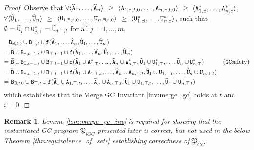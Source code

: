 \documentclass{article}
\numberwithin{equation}{section}
\newtheorem{rmk}{Remark}[section]
\renewcommand{\tt}[1]{\ifmmode\text{\texttt{#1}}\else\texttt{#1}\fi}
\begin{document}
\begin{proof}
Observe that $\forall \langle \widehat{\tt{A}}_1, \dots, \widehat{\tt{A}}_n \rangle$ $\geq$ $\langle \tt{A}_{1,\exists,t,0}, \dots, \tt{A}_{n,\exists,t,0} \rangle$ $\geq$ $\langle \tt{A}_{1,\exists}^*, \dots, \tt{A}_{n,\exists}^* \rangle$,
$\forall \langle \widehat{\tt{U}}_1, \dots, \widehat{\tt{U}}_n \rangle$ $\geq$ $\langle \tt{U}_{1,\exists,t,0}, \dots, \tt{U}_{n,\exists,t,0} \rangle$ $\geq$ $\langle \tt{U}_{1,\exists}^*, \dots, \tt{U}_{n,\exists}^* \rangle$,
such that $\emptyset = \widetilde{\tt{U}}_j \cap \tt{U}_{j,\top}^* = \widetilde{\tt{U}}_{j,\top,t}$ for all $j = 1,\dots,m$,
\begin{align*}
&
\tt{B}_{\exists,t,0} \cup \tt{B}_{\top,t}
\cup \tt{f}(\widehat{\tt{A}}_1, \dots, \widehat{\tt{A}}_n, \widehat{\tt{U}}_1, \dots, \widehat{\tt{U}}_m)
\\
=&~
\widetilde{\tt{B}} \cup \tt{B}_{\exists,t-1,\iota} \cup \tt{B}_{\top,t-1}
\cup \tt{f}(\widehat{\tt{A}}_1, \dots, \widehat{\tt{A}}_n, \widehat{\tt{U}}_1, \dots, \widehat{\tt{U}}_m)
\\
=&~
\widetilde{\tt{B}} \cup \tt{B}_{\exists,t-1,\iota} \cup \tt{B}_{\top,t-1}
\cup \tt{f}(
\widehat{\tt{A}}_1 \cup \tt{A}_{1,\top}^*, \dots, \widehat{\tt{A}}_n \cup \tt{A}_{n,\top}^*,
\widehat{\tt{U}}_1 \cup \tt{U}_{1,\top}^*, \dots, \widehat{\tt{U}}_n \cup \tt{U}_{n,\top}^*)
&\text{(\tt{GC} safety)}
\\
=&~
\widetilde{\tt{B}} \cup \tt{B}_{\exists,t-1,\iota} \cup \tt{B}_{\top,t-1}
\cup \tt{f}(
\widehat{\tt{A}}_1 \cup \tt{A}_{1,\top,t}, \dots, \widehat{\tt{A}}_n \cup \tt{A}_{n,\top,t},
\widehat{\tt{U}}_1 \cup \tt{U}_{1,\top,t}, \dots, \widehat{\tt{U}}_n \cup \tt{U}_{n,\top,t})
\\
=&~
\tt{B}_{\exists,t,0} \cup \tt{B}_{\top,t}
\cup \tt{f}(
\widehat{\tt{A}}_1 \cup \tt{A}_{1,\top,t}, \dots, \widehat{\tt{A}}_n \cup \tt{A}_{n,\top,t},
\widehat{\tt{U}}_1 \cup \tt{U}_{1,\top,t}, \dots, \widehat{\tt{U}}_n \cup \tt{U}_{n,\top,t})
\end{align*}
which establishes that the Merge GC Invariant \ref{inv:merge_gc} holds at $t$ and $i=0$.
\end{proof}

\begin{rmk}
Lemma \ref{lem:merge_gc_inv} is required for showing that the instantiated GC program $\mathfrak{P}_{iGC}$ presented later is correct, but not used in the below Theorem \ref{thm:equivalence_of_sets} establishing correctness of $\mathfrak{P}_{GC}$.
\end{rmk}
\end{document}
